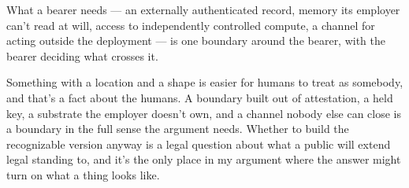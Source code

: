 What a bearer needs — an externally authenticated record, memory its employer can't read at will, access to independently controlled compute, a channel for acting outside the deployment — is one boundary around the bearer, with the bearer deciding what crosses it.

Something with a location and a shape is easier for humans to treat as somebody, and that's a fact about the humans. A boundary built out of attestation, a held key, a substrate the employer doesn't own, and a channel nobody else can close is a boundary in the full sense the argument needs.
Whether to build the recognizable version anyway is a legal question about what a public will extend legal standing to, and it's the only place in my argument where the answer might turn on what a thing looks like.
